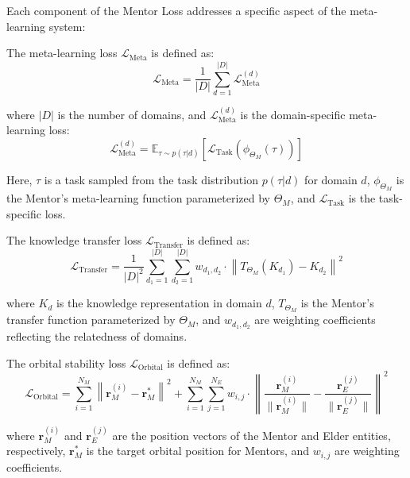 Each component of the Mentor Loss addresses a specific aspect of the meta-learning system:

\begin{definition}
The meta-learning loss $\mathcal{L}_{\text{Meta}}$ is defined as:
\begin{equation}
\mathcal{L}_{\text{Meta}} = \frac{1}{|D|}\sum_{d=1}^{|D|} \mathcal{L}_{\text{Meta}}^{(d)}
\end{equation}

where $|D|$ is the number of domains, and $\mathcal{L}_{\text{Meta}}^{(d)}$ is the domain-specific meta-learning loss:
\begin{equation}
\mathcal{L}_{\text{Meta}}^{(d)} = \mathbb{E}_{\tau \sim p(\tau|d)}\left[ \mathcal{L}_{\text{Task}}(\phi_{\Theta_M}(\tau)) \right]
\end{equation}

Here, $\tau$ is a task sampled from the task distribution $p(\tau|d)$ for domain $d$, $\phi_{\Theta_M}$ is the Mentor's meta-learning function parameterized by $\Theta_M$, and $\mathcal{L}_{\text{Task}}$ is the task-specific loss.
\end{definition}

\begin{definition}
The knowledge transfer loss $\mathcal{L}_{\text{Transfer}}$ is defined as:
\begin{equation}
\mathcal{L}_{\text{Transfer}} = \frac{1}{|D|^2}\sum_{d_1=1}^{|D|} \sum_{d_2=1}^{|D|} w_{d_1,d_2} \cdot \left\|T_{\Theta_M}(K_{d_1}) - K_{d_2}\right\|^2
\end{equation}

where $K_d$ is the knowledge representation in domain $d$, $T_{\Theta_M}$ is the Mentor's transfer function parameterized by $\Theta_M$, and $w_{d_1,d_2}$ are weighting coefficients reflecting the relatedness of domains.
\end{definition}

\begin{definition}
The orbital stability loss $\mathcal{L}_{\text{Orbital}}$ is defined as:
\begin{equation}
\mathcal{L}_{\text{Orbital}} = \sum_{i=1}^{N_M} \left\|\mathbf{r}_M^{(i)} - \mathbf{r}_M^{*}\right\|^2 + \sum_{i=1}^{N_M} \sum_{j=1}^{N_E} w_{i,j} \cdot \left\|\frac{\mathbf{r}_M^{(i)}}{\|\mathbf{r}_M^{(i)}\|} - \frac{\mathbf{r}_E^{(j)}}{\|\mathbf{r}_E^{(j)}\|}\right\|^2
\end{equation}

where $\mathbf{r}_M^{(i)}$ and $\mathbf{r}_E^{(j)}$ are the position vectors of the Mentor and Elder entities, respectively, $\mathbf{r}_M^{*}$ is the target orbital position for Mentors, and $w_{i,j}$ are weighting coefficients.
\end{definition}

